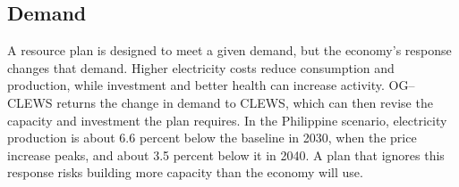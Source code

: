 \subsection{Demand}

A resource plan is designed to meet a given demand, but the economy's response changes that
demand. Higher electricity costs reduce consumption and production, while investment and
better health can increase activity. OG--CLEWS returns the change in demand to CLEWS, which
can then revise the capacity and investment the plan requires. In the Philippine
scenario, electricity production is about 6.6 percent below the baseline in 2030, when the price increase peaks, and about 3.5 percent below it in 2040. A
plan that ignores this response risks building more capacity than the economy will use.
